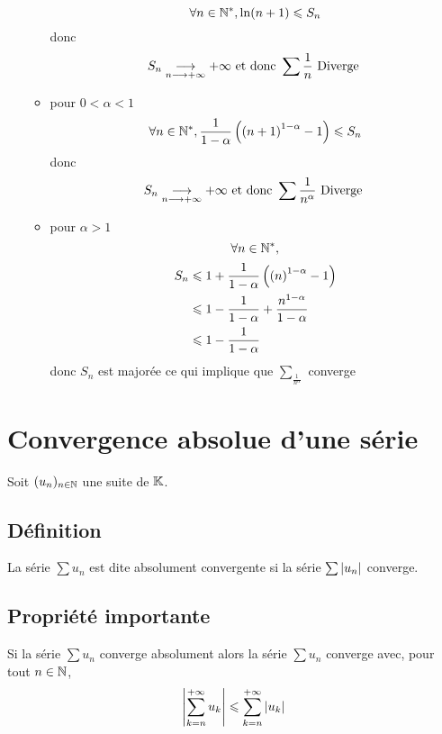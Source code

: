 \begin{dem}
\begin{itemize}
\begin{itemize}
                    \[\forall n \in \mathbb{N}^*, \ln(n+1)\leqslant S_n\] 
                    donc 
                    \[S_n \underset{n \longrightarrow +\infty}{\longrightarrow} +\infty \text{ et donc } \sum \frac{1}{n} \text{ Diverge }\]
                \item pour \( 0 < \alpha < 1\)
                    \[\forall n \in \mathbb{N}^*, \frac{1}{1-\alpha}\left(\left(n+1\right)^{1-\alpha}-1\right)\leqslant S_n\] 
                    donc 
                    \[S_n \underset{n \longrightarrow +\infty}{\longrightarrow} +\infty \text{ et donc } \sum \frac{1}{n^{\alpha}} \text{ Diverge }\]
                \item pour \(\alpha > 1\)
                    \[ \forall n \in \mathbb{N}^*,\] 
                    \begin{align*}
                        S_n &\leqslant 1+ \frac{1}{1-\alpha}\left(\left(n\right)^{1-\alpha}-1\right)\\
                            &\leqslant 1 - \frac{1}{1-\alpha} + \frac{n^{1-\alpha}}{1-\alpha}\\
                            &\leqslant 1 - \frac{1}{1-\alpha}
                    \end{align*}
                    donc \(S_n\) est majorée ce qui implique que \(\sum_{\frac{1}{n^{\alpha}}}\) converge
            \end{itemize}
    \end{itemize}
\end{dem}

\section{Convergence absolue d’une série}
    Soit \((u_n)_{n\in \mathbb{N} }\) une suite de \(\mathbb{K}\).
\subsection{Définition}
\begin{defi}
    La série \(\sum u_n \) est dite absolument convergente si la série  \(\sum \left\lvert u_n\right\rvert\) converge.
\end{defi}
\subsection{Propriété importante}
\begin{defprop}
    Si la série \(\sum u_n \) converge absolument alors la série \(\sum u_n \) converge avec, pour tout \(n \in  \mathbb{N}\),
    \[\left\lvert\sum^{+\infty}_{k=n}u_k\right\rvert \leqslant\sum^{+\infty}_{k=n}\left\lvert u_k\right\rvert\]
\end{defprop}



